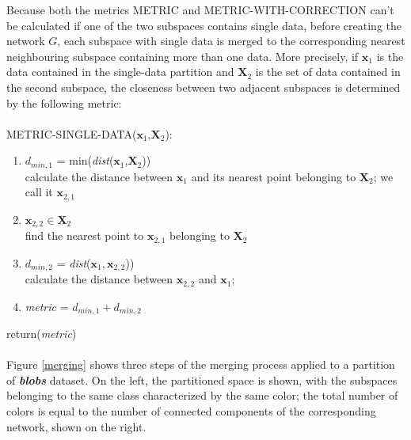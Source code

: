 \documentclass[a4paper]{article}
\begin{document}
Because both the metrics METRIC and METRIC-WITH-CORRECTION can't be calculated if one of the two subspaces contains single data, before creating the network $G$, each subspace with single data is merged to the corresponding nearest neighbouring subspace containing more than one data.
More precisely, if $\pmb{x}_1$ is the data contained in the single-data partition and $\pmb{X}_2$ is the set of data contained in the second subspace, the closeness between two adjacent subspaces is determined by the following metric:\\ \\
METRIC-SINGLE-DATA($\pmb{x}_1$,$\pmb{X}_2$):
\begin{enumerate}[nolistsep]
\item $d_{min,1}$ = min(\emph{dist}($\pmb{x}_1$,$\pmb{X}_2$))\\ 
calculate the distance between $\pmb{x}_1$ and its nearest point belonging to $\pmb{X}_2$;  we call it $\pmb{x}_{2,1}$
\item $\pmb{x}_{2,2} \in \pmb{X}_{2}$\\
find the nearest point to $\pmb{x}_{2,1}$ belonging to $\pmb{X}_{2}$
\item $d_{min,2}$ = \emph{dist}($\pmb{x}_{1},\pmb{x}_{2,2}$))\\ 
calculate the distance between $\pmb{x}_{2,2}$ and $\pmb{x}_1$; 
\item \emph{metric} =  $d_{min,1} + d_{min,2}$
\end{enumerate}
return(\emph{metric})\\ \\

Figure \ref{merging} shows three steps of the merging process applied to a partition of \emph{\textbf{blobs}} dataset. 
On the left, the partitioned space is shown, with the subspaces belonging to the same class characterized by the same color;
the total number of colors is equal to the number of connected components of the corresponding network, shown on the right.
\end{document}
